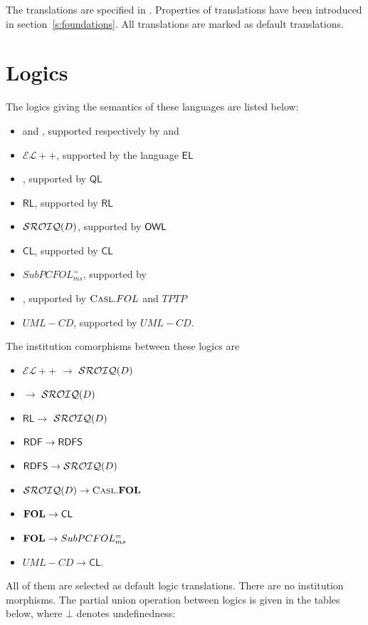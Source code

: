 \documentclass[10pt,fleqn,final]{scrreprt}
\makeatletter
\newcommand*\CommentAuthor{}
\renewcommand*\CommentAuthor{#1}}
\newcommand*\CommentDate{}
\renewcommand*\CommentDate{#1}}
\newcommand*\CommentId{}
\renewcommand*\CommentId{#1}}
\newcommand*\CommentType{}
\renewcommand*\CommentType{#1}}
\newcommand*{\SetCommentColorByType}[1]{%
\edef\localType{{#1}}%
\expandafter\ifstrequal\localType{q-aut}{\colorlet{CommentColor}{red}}{%
\expandafter\ifstrequal\localType{q-all}{\colorlet{CommentColor}{orange}}{%
\expandafter\ifstrequal\localType{todo}{\colorlet{CommentColor}{orange}}{%
\expandafter\ifstrequal\localType{fyi}{\colorlet{CommentColor}{lightgray}}{%
\colorlet{CommentColor}{yellow}}}}}}
\newcommand*{\SetCommentPrefixByType}[1]{%
\edef\localType{{#1}}%
\expandafter\@ifmtarg\localType{%
\edef\CommentPrefix{}%
}{%
\caseupper[q]{#1}%
\edef\CommentPrefix{\thestring: }%
}}
\newcommand*{\initComment}[1]{%
\setkeys{Comment}{#1}%
\SetCommentColorByType{\CommentType}%
\relax%
\SetCommentPrefixByType{\CommentType}%
\relax%
}
\newcommand*{\todonote}[2][]{%
\initComment{#1}%
\pdfcomment[author=\CommentAuthor,color=CommentColor,date=\CommentDate,id=\CommentId]{%
\CommentPrefix
#2}}
\renewcommand*{\todonote}[2][]{%
\initComment{#1}%
\ednote{\CommentPrefix #2}}
\newcommand*{\CL}{\ensuremath{\mathsf{CL}}\xspace}
\newcommand{\QL}{\ensuremath{\mathsf{QL}}\xspace}
\newcommand{\RL}{\ensuremath{\mathsf{RL}}\xspace}
\newcommand{\EL}{\ensuremath{\mathsf{EL}}\xspace}
\newcommand{\ELDL}{\ensuremath{\mathcal{EL}}\xspace}
\newcommand{\sclause}[1]{\section{#1}}
\newenvironment{definitions}[0]{\medskip }{}
\makeatother
\begin{document}
\begin{definitions}
The translations are specified in \cite{OntoGraph,MossakowskiEtAl14b}.
Properties of translations have been introduced in section~\ref{s:foundations}.
All translations are marked as default translations. 

\sclause{Logics}

The logics giving the semantics of these languages are listed below:
\begin{itemize}
 \item \RDF and \RDFS, supported respectively by \RDF and \RDFS
 \item $\ELDL++$, supported by the language \EL
 \item \DLLiteR, supported by \QL
 \item \RL, supported by \RL
 \item $\mathcal{SROIQ}(D)$, supported by $\mathsf{OWL}$
 \item \CL, supported by \CL
 \item $SubPCFOL^=_{ms}$, supported by \CASL
 \item \FOL, supported by $\textmd{\textsc{Casl}}.FOL$ and $TPTP$
 \item $UML-CD$, supported by $UML-CD$.
\end{itemize}

The institution comorphisms between these logics are
\begin{itemize}
  \item $\ELDL++$ $\to$ $\mathcal{SROIQ}(D)$ 
  \item \DLLiteR $\to$ $\mathcal{SROIQ}(D)$ 
  \item \RL $\to$ $\mathcal{SROIQ}(D)$ 
  \item $\mathsf{RDF} \to \mathsf{RDFS}$
  \item $\mathsf{RDFS} \to \mathcal{SROIQ}(D)$ 
  \item $\mathcal{SROIQ}(D)  \to \textmd{\textsc{Casl}}.\mathbf{FOL}$
  \item $\FOL \to \CL$
  \item $\mathbf{FOL} \to SubPCFOL^=_{ms}$
  \item $UML-CD \to \CL$.
\end{itemize}

All of them are selected as default logic translations. There are no institution morphisms. The partial union operation between logics is given in the tables below, where
$\bot$ denotes undefinedness:



\end{definitions}
\end{document}
